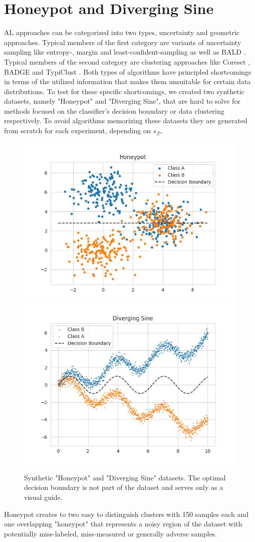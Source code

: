 \documentclass[]{article}
\newcommand{\D}{\mathcal{D}}
\begin{document}
\section{Honeypot and Diverging Sine}
AL approaches can be categorized into two types, uncertainty and geometric approaches.
Typical members of the first category are variants of uncertainty sampling like entropy-, margin and least-confident-sampling \cite{wang2014new} as well as BALD \cite{gal2017deep}.
Typical members of the second category are clustering approaches like Coreset \cite{sener2017active}, BADGE \cite{ashdeep} and TypiClust \cite{hacohen2022active}.
Both types of algorithms have principled shortcomings in terms of the utilized information that makes them unsuitable for certain data distributions. 
To test for these specific shortcomings, we created two synthetic datasets, namely "Honeypot" and "Diverging Sine", that are hard to solve for methods focused on the classifier's decision boundary or data clustering respectively. 
To avoid algorithms memorizing these datasets they are generated from scratch for each experiment, depending on $s_\D$. \\
\begin{figure}[]
	\centering
	\caption{Synthetic "Honeypot" and "Diverging Sine" datasets. The optimal decision boundary is not part of the dataset and serves only as a visual guide.}
	\includegraphics[width=0.4\linewidth]{img/honeypot.jpg}
	\includegraphics[width=0.4\linewidth]{img/diverging_sin.jpg}
	\label{fig:synthDataAppendix}
\end{figure}
%
Honeypot creates to two easy to distinguish clusters with 150 samples each and one overlapping "honeypot" that represents a noisy region of the dataset with potentially miss-labeled, miss-measured or generally adverse samples.
\end{document}
